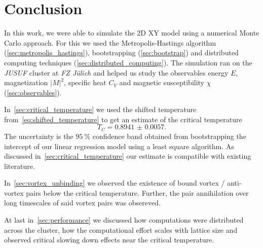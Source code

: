 \section{Conclusion}
In this work, we were able to simulate the $2$D XY model using a numerical Monte Carlo approach. For this we used the Metropolis-Hastings algorithm (\cref{sec:metropolis_hastings}), bootstrapping (\cref{sec:bootstrap}) and distributed computing techniques (\cref{sec:distributed_computing}). The simulation ran on the \emph{JUSUF} cluster at \emph{FZ Jülich} and helped us study the observables energy $E$, magnetization ${\lvert M \rvert}^2$, specific heat $C_V$ and magnetic susceptibility $\chi$ (\cref{sec:observables}).

In~\cref{sec:critical_temperature} we used the shifted temperature  from~\cref{eq:shifted_temperature} to get an estimate of the critical temperature
\begin{equation}
	T_C = \num{0.8941(57)}.
\end{equation}
The uncertainty is the $\SI{95}{\percent}$ confidence band obtained from bootstrapping the intercept of our linear regression model using a least square algorithm. As discussed in~\cref{sec:critical_temperature} our estimate is compatible with existing literature.

In~\cref{sec:vortex_unbinding} we observed the existence of bound vortex / anti-vortex pairs below the critical temperature. Further, the pair annihilation over long timescales of said vortex pairs was obsereved.

At last in~\cref{sec:performance} we discussed how computations were distributed across the cluster, how the computational effort scales with lattice size and observed critical slowing down effects near the critical temperature.